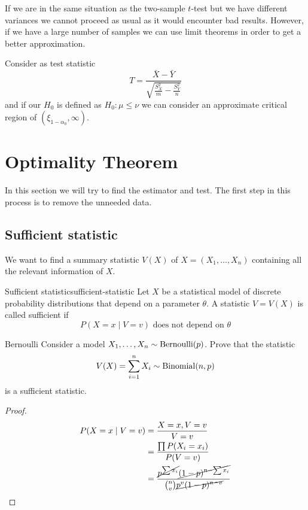 \documentclass[12pt]{extarticle}
\newcommand{\Bernoulli}{{\operatorfont Bernoulli}}
\newcommand{\Binomial}{{\operatorfont Binomial}}
\begin{document}
If we are in the same situation as the two-sample $t$-test but we have different variances
we cannot proceed as usual as it would encounter bad results.
However, if we have a large number of samples we can use limit theorems in order to get a better approximation.

Consider as test statistic
\begin{equation}
	T = \frac{\bar X - \bar Y}{\sqrt{\frac{S_X^2}{m} - \frac{S_Y^2}{n}}}
\end{equation}
and if our $H_0$ is defined as $H_0 : \mu \leq \nu$
we can consider an approximate critical region of $(\xi_{1-\alpha_0}, \infty)$.


\section{Optimality Theorem}

In this section we will try to find the  estimator and test.
The first step in this process is to remove the unneeded data.

\subsection{Sufficient statistic}

We want to find a summary statistic $V(X)$ of $X = (X_1, \dots, X_n)$ containing all the relevant information of $X$.

\begin{definition}{Sufficient statistic}{sufficient-statistic}
	Let $X$ be a statistical model of discrete probability distributions that depend on a parameter $\theta$.
	A statistic $V = V(X)$ is called sufficient if
	\begin{equation}
		P(X = x \mid V = v) \text{ does not depend on } \theta
	\end{equation}
\end{definition}

\begin{example}{Bernoulli}{}
	Consider a model $X_1, \dots, X_n \sim \Bernoulli(p)$.
	Prove that the statistic
	\begin{equation}
		V(X) = \sum_{i =1}^n X_i \sim \Binomial(n, p)
	\end{equation}
	is a sufficient statistic.
\end{example}

\begin{proof}
	\begin{align}
		P(X = x \mid V = v) & = \frac{X = x, V = v}{V = v}                                                                          \\
		                    & = \frac{\prod P(X_i = x_i)}{P(V = v)}                                                                 \\
		                    & = \frac{\cancel{p^{\sum x_i}} \cancel{(1-p)^{n - \sum x_i}}}{\binom{n}{v} \cancel{p^v (1-p)^{n - v}}}
	\end{align}
\end{proof}
\end{document}

